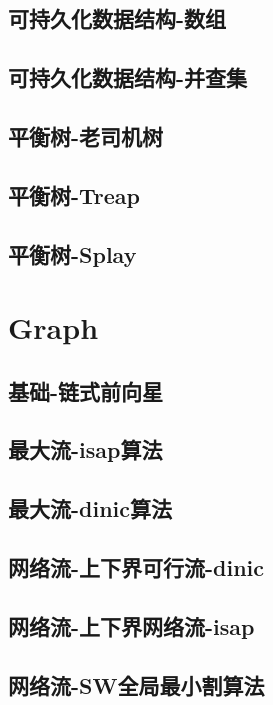 \documentclass[UTF8]{ctexart}
\begin{document}
\begin{CJK}{UTF8}{<font>}
\begin{spacing}{0.80}
\subsection{可持久化数据结构-数组} 
\subsection{可持久化数据结构-并查集} 
\subsection{平衡树-老司机树} 
\subsection{平衡树-Treap} 
\subsection{平衡树-Splay} 
\section{Graph}
\subsection{基础-链式前向星} 
\subsection{最大流-isap算法} 
\subsection{最大流-dinic算法} 
\subsection{网络流-上下界可行流-dinic} 
\subsection{网络流-上下界网络流-isap} 
\subsection{网络流-SW全局最小割算法} 

\end{spacing}
\end{CJK}
\end{document}
